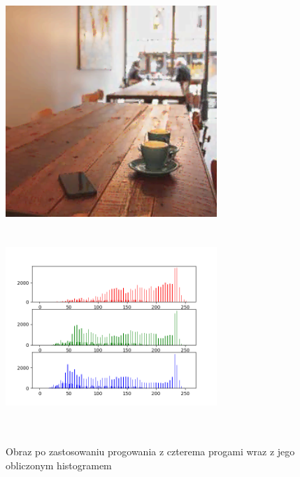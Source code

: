 \documentclass[a4paper,12pt]{book}
\begin{document}
\begin{figure}[H]	
	\caption{Obraz po zastosowaniu progowania z czterema progami wraz z jego obliczonym histogramem}
	\includegraphics[width=8cm, height=8cm]{6-5/multi-local-threshold-image-coffee-4.png}
	\includegraphics[width=8cm, height=8cm]{6-5/multi-local-threshold-coffee-4.png}
\end{figure}
\end{document}
